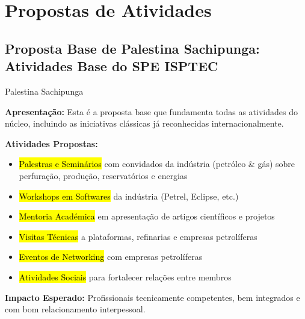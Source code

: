 \documentclass[12pt,a4paper,oneside]{article}
\begin{document}
\newpage


\section{Propostas de Atividades}

\subsection{Proposta Base de Palestina Sachipunga: Atividades Base do SPE ISPTEC}

\begin{proposalbox}{Palestina Sachipunga}

\textbf{Apresentação:} Esta é a proposta base que fundamenta todas as atividades do núcleo, incluindo as iniciativas clássicas já reconhecidas internacionalmente.

\medskip

\textbf{Atividades Propostas:}

\begin{itemize}[label={\color{spe-secondary}$\bullet$}]
  \item \hl{Palestras e Seminários} com convidados da indústria (petróleo \& gás) sobre perfuração, produção, reservatórios e energias
  \item \hl{Workshops em Softwares} da indústria (Petrel, Eclipse, etc.)
  \item \hl{Mentoria Académica} em apresentação de artigos científicos e projetos
  \item \hl{Visitas Técnicas} a plataformas, refinarias e empresas petrolíferas
  \item \hl{Eventos de Networking} com empresas petrolíferas
  \item \hl{Atividades Sociais} para fortalecer relações entre membros
\end{itemize}

\medskip

\textbf{Impacto Esperado:} Profissionais tecnicamente competentes, bem integrados e com bom relacionamento interpessoal.

\end{proposalbox}

\newpage


\end{document}

